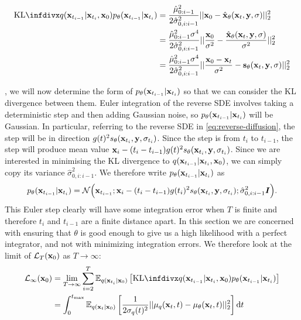 \begin{align}
    \kl{q(\rvx_{t_{i-1}} | \rvx_{t_i}, \rvx_0)}{p_\theta(\rvx_{t_{i-1}} | \rvx_{t_i})} 
    &= \frac{\hat{\mu}_{0:i-1}^2}{2 \hat{\sigma}_{0,i:i-1}^2} || \rvx_0 - \hat{\rvx}_\theta(\rvx_t, \rvy, \sigma) ||_2^2 \\
    &= \frac{\hat{\mu}_{0:i-1}^2 \sigma^4}{2 \hat{\sigma}_{0,i:i-1}^2} || \frac{\rvx_0}{\sigma^2} - \frac{\hat{\rvx}_\theta(\rvx_t, \rvy, \sigma)}{\sigma^2} ||_2^2 \\
    &= \frac{\hat{\mu}_{0:i-1}^2 \sigma^4}{2 \hat{\sigma}_{0,i:i-1}^2} || \frac{\rvx_0-\rvx_t}{\sigma^2} - \rvs_\theta(\rvx_t, \rvy, \sigma) ||_2^2
\end{align}


, we will now determine the form of $p_\theta({\mathbf{x}}_{t_{i-1}}|{\mathbf{x}}_{t_i})$ so that we can consider the KL divergence between them. Euler integration of the reverse SDE involves taking a deterministic step and then adding Gaussian noise, so $p_\theta({\mathbf{x}}_{t_{i-1}}|{\mathbf{x}}_{t_i})$ will be Gaussian. In particular, referring to the reverse SDE in \cref{eq:reverse-diffusion}, the step will be in direction $g(t)^2 s_\theta({\mathbf{x}}_{t_i}, {\mathbf{y}}, \sigma_{t_i})$. Since the step is from $t_i$ to $t_{i-1}$, the step will produce mean value ${\mathbf{x}}_i - (t_i-t_{i-1}) g(t)^2 s_\theta({\mathbf{x}}_{t_i}, {\mathbf{y}}, \sigma_{t_i})$.
%
Since we are interested in minimising the KL divergence to $q({\mathbf{x}}_{t_{i-1}} | {\mathbf{x}}_{t_i}, {\mathbf{x}}_0)$, we can simply copy its variance $\hat{\sigma}_{0,i:i-1}^2$. We therefore write $p_\theta({\mathbf{x}}_{t_{i-1}}|{\mathbf{x}}_{t_i})$ as
\begin{equation}
    p_\theta({\mathbf{x}}_{t_{i-1}}|{\mathbf{x}}_{t_i}) = {\mathcal{N}} \Big( {\mathbf{x}}_{t_{i-1}}; {\mathbf{x}}_i-(t_i-t_{i-1}) g(t_i)^2 s_\theta({\mathbf{x}}_{t_i}, {\mathbf{y}}, \sigma_{t_i}); \hat{\sigma}_{0,i:i-1}^2 {\bm{I}} \Big).
\end{equation}
This Euler step clearly will have some integration error when $T$ is finite and therefore $t_i$ and $t_{i-1}$ are a finite distance apart. In this section we are concerned with ensuring that $\theta$ is good enough to give us a high likelihood with a perfect integrator, and not with minimizing integration errors. We therefore look at the limit of $\mathcal{L}_T({\mathbf{x}}_0)$ as $T \rightarrow \infty$:
\begin{align}
    \mathcal{L}_\infty(\rvx_0) &= \lim_{T\rightarrow\infty} \sum_{i=2}^T \EX_{q(\rvx_{t_i}|\rvx_0)} \left[ \kl{q(\rvx_{t_{i-1}} | \rvx_{t_i}, \rvx_0)}{p_\theta(\rvx_{t_{i-1}} | \rvx_{t_i})} \right] \\
    &= \int_0^{t_\text{max}} \EX_{q(\rvx_t|\rvx_0)} \left[ \frac{1}{2\sigma_q(t)^2} || \mu_q(\rvx_t, t) - \mu_\theta(\rvx_t, t) ||_2^2 \right] \mathrm{d}t
\end{align}

